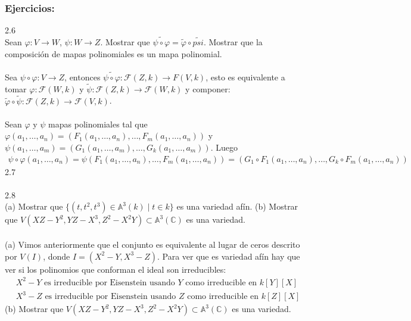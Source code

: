 \documentclass{article}
\newcommand{\A}{\mathbb{A}}
\newcommand{\C}{\mathbb{C}}
\begin{document}
\subsubsection*{Ejercicios:}
2.6
\\
Sean $\varphi:V \to W$, $\psi: W \to Z$. Mostrar que $\tilde{\psi \circ \varphi}=\tilde{\varphi} \circ \tilde{psi}$. Mostrar que la composición de mapas polinomiales es un mapa polinomial.
\\
\\
Sea $\psi \circ \varphi:V \to Z$, entonces $\tilde{\psi \circ \varphi}:\mathcal{F}(Z,k) \to F(V,k)$, esto es equivalente a tomar $\varphi: \mathcal{F}(W,k)$ y $\tilde{\psi}: \mathcal{F}(Z,k) \to \mathcal{F}(W,k)$ y componer: $\tilde{\varphi} \circ \tilde{\psi}: \mathcal{F}(Z,k) \to \mathcal{F}(V,k)$.
\\
\\
Sean $\varphi$ y $\psi$ mapas polinomiales tal que $\varphi(a_1,\dots,a_n)=(F_1(a_1,\dots,a_n),\dots,F_m(a_1,\dots,a_n))$ y $\psi(a_1,\dots,a_m)=(G_1(a_1,\dots,a_m),\dots,G_k(a_1,\dots,a_m))$. Luego
\begin{equation*}
\begin{aligned}
    \psi \circ \varphi(a_1,\dots,a_n)=\psi(F_1(a_1,\dots,a_n),\dots,F_m(a_1,\dots,a_n))=(G_1 \circ F_1(a_1,\dots,a_n),\dots,G_k \circ F_m(a_1,\dots,a_n))
\end{aligned}
\end{equation*}
2.7
\\
\\
2.8
\\
(a) Mostrar que $\{(t,t^2,t^3) \in \A^3(k) \mid t \in k \}$ es una variedad afín. (b) Mostrar que $V(XZ-Y^2,YZ-X^3,Z^2-X^2Y) \subset \A^3(\C)$ es una variedad.
\\
\\
(a) Vimos anteriormente que el conjunto es equivalente al lugar de ceros descrito por $V(I)$, donde $I=(X^2-Y,X^3-Z)$. Para ver que es variedad afín hay que ver si los polinomios que conforman el ideal son irreducibles:
\begin{equation*}
\begin{aligned}
    &X^2-Y \text{ es irreducible por Eisenstein usando $Y$ como irreducible en } k[Y][X] \\
    &X^3-Z \text{ es irreducible por Eisenstein usando $Z$ como irreducible en } k[Z][X]
\end{aligned}
\end{equation*}
(b) Mostrar que $V(XZ-Y^2,YZ-X^3,Z^2-X^2Y) \subset \A^3(\C)$ es una variedad.
\end{document}
